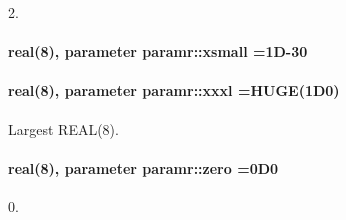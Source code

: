 2. 

\paragraph[{\texorpdfstring{xsmall}{xsmall}}]{\setlength{\rightskip}{0pt plus 5cm}real(8), parameter paramr\+::xsmall =1\+D-\/30}\hypertarget{namespaceparamr_a876da96687a8b24b0621640d862bea99}{}\label{namespaceparamr_a876da96687a8b24b0621640d862bea99}
\paragraph[{\texorpdfstring{xxxl}{xxxl}}]{\setlength{\rightskip}{0pt plus 5cm}real(8), parameter paramr\+::xxxl =H\+U\+GE(1\+D0)}\hypertarget{namespaceparamr_a6bf23a9b98d0c83e261277cb9bb303fb}{}\label{namespaceparamr_a6bf23a9b98d0c83e261277cb9bb303fb}


Largest R\+E\+A\+L(8). 

\paragraph[{\texorpdfstring{zero}{zero}}]{\setlength{\rightskip}{0pt plus 5cm}real(8), parameter paramr\+::zero =0\+D0}\hypertarget{namespaceparamr_afe699408c9872c88006dfddc7e87e2da}{}\label{namespaceparamr_afe699408c9872c88006dfddc7e87e2da}


0. 

